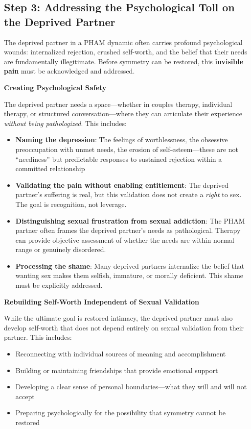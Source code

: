 \documentclass[12pt,openany]{book}
\numberwithin{equation}{chapter}
\begin{document}
\subsection{Step 3: Addressing the Psychological Toll on the Deprived Partner}

The deprived partner in a PHAM dynamic often carries profound psychological wounds: internalized rejection, crushed self-worth, and the belief that their needs are fundamentally illegitimate. Before symmetry can be restored, this \textbf{invisible pain} must be acknowledged and addressed.

\textbf{Creating Psychological Safety}

The deprived partner needs a space---whether in couples therapy, individual therapy, or structured conversation---where they can articulate their experience \textit{without being pathologized}. This includes:

\begin{itemize}
    \item \textbf{Naming the depression}: The feelings of worthlessness, the obsessive preoccupation with unmet needs, the erosion of self-esteem---these are not ``neediness'' but predictable responses to sustained rejection within a committed relationship
    \item \textbf{Validating the pain without enabling entitlement}: The deprived partner's suffering is real, but this validation does not create a \textit{right} to sex. The goal is recognition, not leverage.
    \item \textbf{Distinguishing sexual frustration from sexual addiction}: The PHAM partner often frames the deprived partner's needs as pathological. Therapy can provide objective assessment of whether the needs are within normal range or genuinely disordered.
    \item \textbf{Processing the shame}: Many deprived partners internalize the belief that wanting sex makes them selfish, immature, or morally deficient. This shame must be explicitly addressed.
\end{itemize}

\textbf{Rebuilding Self-Worth Independent of Sexual Validation}

While the ultimate goal is restored intimacy, the deprived partner must also develop self-worth that does not depend entirely on sexual validation from their partner. This includes:

\begin{itemize}
    \item Reconnecting with individual sources of meaning and accomplishment
    \item Building or maintaining friendships that provide emotional support
    \item Developing a clear sense of personal boundaries---what they will and will not accept
    \item Preparing psychologically for the possibility that symmetry cannot be restored
\end{itemize}
\end{document}

